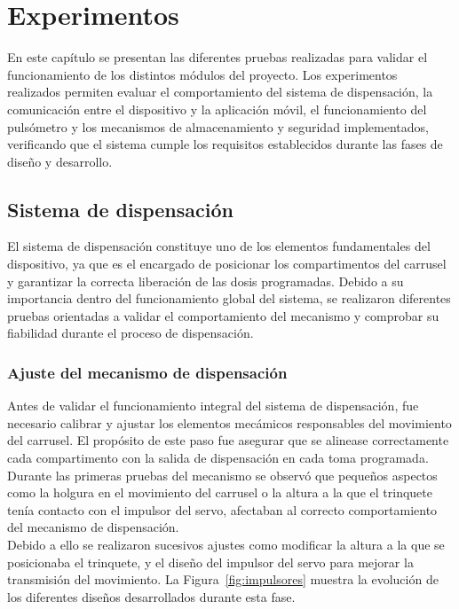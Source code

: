 \chapter{Experimentos}
\label{cap:capitulo6}

\vspace{1cm}

En este capítulo se presentan las diferentes pruebas realizadas para validar el funcionamiento de los distintos módulos del proyecto. Los experimentos realizados permiten evaluar el comportamiento del sistema de dispensación, la comunicación entre el dispositivo y la aplicación móvil, el funcionamiento del pulsómetro y los mecanismos de almacenamiento y seguridad implementados, verificando que el sistema cumple los requisitos establecidos durante las fases de diseño y desarrollo.


\section{Sistema de dispensación}

El sistema de dispensación constituye uno de los elementos fundamentales del dispositivo, ya que es el encargado de posicionar los compartimentos del carrusel y garantizar la correcta liberación de las dosis programadas. Debido a su importancia dentro del funcionamiento global del sistema, se realizaron diferentes pruebas orientadas a validar el comportamiento del mecanismo y comprobar su fiabilidad durante el proceso de dispensación.

\subsection{Ajuste del mecanismo de dispensación}

Antes de validar el funcionamiento integral del sistema de dispensación, fue necesario calibrar y ajustar los elementos mecámicos responsables del movimiento del carrusel. El propósito de este paso fue asegurar que se alinease correctamente cada compartimento con la salida de dispensación en cada toma programada.\\

Durante las primeras pruebas del mecanismo se observó que pequeños aspectos como la holgura en el movimiento del carrusel o la altura a la que el trinquete tenía contacto con el impulsor del servo, afectaban al correcto comportamiento del mecanismo de dispensación.\\

Debido a ello se realizaron sucesivos ajustes como modificar la altura a la que se posicionaba el trinquete, y el diseño del impulsor del servo para mejorar la transmisión del movimiento. La Figura~\ref{fig:impulsores} muestra la evolución de los diferentes diseños desarrollados durante esta fase.

